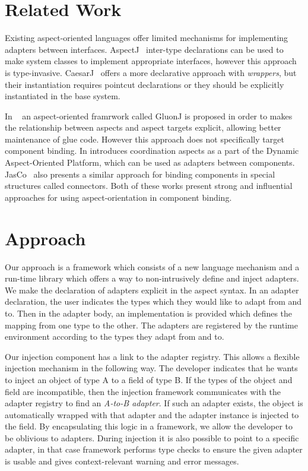 \documentclass{acm_proc_article-sp}
\begin{document}
\section{Related Work}
Existing aspect-oriented languages offer limited mechanisms for implementing adapters between interfaces. AspectJ~\cite{kiczales2001overview} inter-type declarations can be used to make system classes to implement appropriate interfaces, however this approach is type-invasive. CaesarJ~\cite{aracic2006overview} offers a more declarative approach with \emph{wrappers}, but their instantiation requires pointcut declarations or they should be explicitly instantiated in the base system. 

In ~\cite{gluonj} an aspect-oriented framrwork called GluonJ is proposed in order to makes the relationship between aspects and aspect targets explicit, allowing better maintenance of glue code. However this approach does not specifically target component binding. In \cite{Pinto} introduces coordination aspects as a part of the Dynamic Aspect-Oriented Platform, which can be used as adapters between components. JasCo~\cite{Suvee} also presents a similar approach for binding components in special structures called connectors. Both of these works present strong and influential approaches for using aspect-orientation in component binding.  


\section{Approach}
Our approach is a framework which consists of a new language mechanism and a run-time library which offers a way to non-intrusively define and inject adapters. We make the declaration of adapters explicit in the aspect syntax. In an adapter declaration, the user indicates the types which they would like to adapt from and to. Then in the adapter body, an implementation is provided which defines the mapping from one type to the other. The adapters are registered by the runtime environment according to the types they adapt from and to. 

Our injection component has a link to the adapter registry. This allows a flexible injection mechanism in the following way. The developer indicates that he wants to inject an object of type A to a field of type B. If the types of the object and field are incompatible, then the injection framework communicates with the adapter registry to find an \emph{A-to-B adapter}. If such an adapter exists, the object is automatically wrapped with that adapter and the adapter instance is injected to the field. By encapsulating this logic in a framework, we allow the developer to be oblivious to adapters. During injection it is also possible to point to a specific adapter, in that case framework performs type checks to ensure the given adapter is usable and gives context-relevant warning and error messages.
\end{document}

